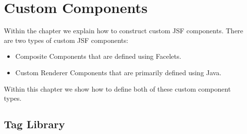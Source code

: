 %

\chapter{Custom Components}
Within the chapter we explain how to construct custom JSF components.
There are two types of custom JSF components:
\begin{itemize}
	\item Composite Components that are defined using Facelets.
	\item Custom Renderer Components that are primarily defined using Java.
\end{itemize}
Within this chapter we show how to define both of these custom component types.

\section{Tag Library}

